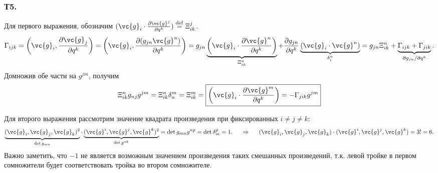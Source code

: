 \subsubsection*{Т5.}
Для первого выражения, обозначим $(\vc{g}_i \cdot \frac{\partial \vc{g}^j}{\partial q^k}) \overset{\mathrm{def}}{=} \Xi_{ik}^j$. 
$$
    \Gamma_{ijk} = \left(\vc{g}_i, \frac{\partial \vc{g}_j}{\partial q^k}\right) 
    = \left(\vc{g}_i, \frac{\partial (g_{jn}\vc{g}^n)}{\partial q^k}\right) =
    g_{jn}
    \underbrace{
        \left(\vc{g}_i \cdot \frac{\partial \vc{g}^n}{\partial q^k} \right)
        }_{\Xi_{ik}^n} +
    \frac{\partial g_{jn}}{\partial q^k} \underbrace{\left(\vc{g}_i \cdot \vc{g}^n\right)}_{\delta_i^n} 
    =
     g_{jn} \Xi_{ik}^n + \underbrace{\Gamma_{ijk} + \Gamma_{jik}}_{\partial g_{jn} / \partial q^k}.
$$
Домножив обе части на $g^{jm}$, получим
$$
    \Xi_{ik}^n g_{nj} g^{jm} =
    \Xi_{ik}^n \delta_n^m = \Xi_{ik}^m = 
     \boxed{\left(\vc{g}_i \cdot \frac{\partial \vc{g}^m}{\partial q^k}\right) = - \Gamma_{jik} g^{jm}}
$$



Для второго выражения рассмотрим значение квадрата произведения при фиксированных $i \neq j \neq k$:
$$
    \underbrace{(\vc{g}_i, \vc{g}_j, \vc{g}_k)^2}_{\det g_{mn}} \cdot 
    \underbrace{(\vc{g}^i, \vc{g}^j, \vc{g}^k)^2}_{\det g^{nk}} = \det g_{mn} g^{np} = \det \delta_m^p = 1.
    \hspace{0.5cm} \Rightarrow \hspace{0.5cm} 
    (\vc{g}_i, \vc{g}_j, \vc{g}_k) \cdot (\vc{g}^i, \vc{g}^j, \vc{g}^k) = 3! = 6.
$$
Важно заметить, что $-1$ не является возможным значением произведения таких смешанных произведений, т.к. левой тройке в первом сомножители будет соответствовать тройка во втором сомножителе.
